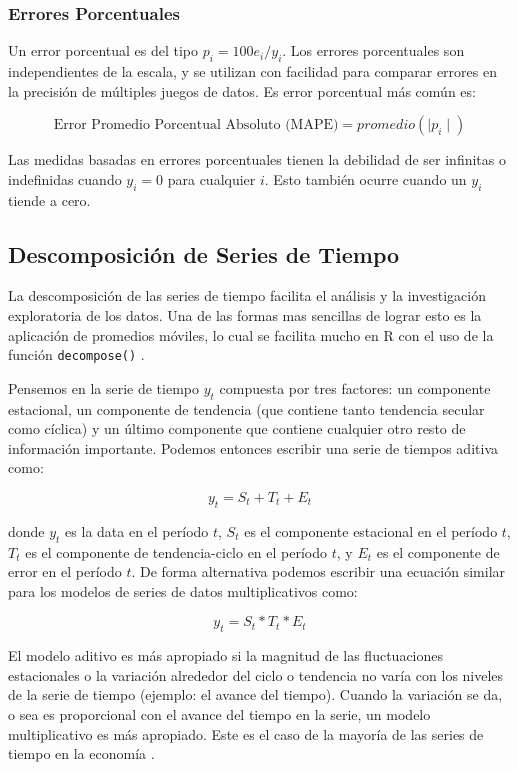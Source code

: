 \subsubsection{Errores Porcentuales}
Un error porcentual es del tipo $p_i = 100 e_i / y_i$. Los errores porcentuales son independientes de la escala, y se utilizan con facilidad para comparar errores en la precisión de múltiples juegos de datos. Es error porcentual más común es:

\[ \text{Error Promedio Porcentual Absoluto (MAPE)} = promedio(\mid p_i \mid) \]

Las medidas basadas en errores porcentuales tienen la debilidad de ser infinitas o indefinidas cuando $y_i = 0$ para cualquier $i$. Esto también ocurre cuando un $y_i$ tiende a cero.

\subsection{Descomposición de Series de Tiempo}
La descomposición de las series de tiempo facilita el análisis y la investigación exploratoria de los datos. Una de las formas mas sencillas de lograr esto es la aplicación de promedios móviles, lo cual se facilita mucho en R con el uso de la función \texttt{decompose()} \cite{daroczi}.

Pensemos en la serie de tiempo $y_t$ compuesta por tres factores: un componente estacional, un componente de tendencia (que contiene tanto tendencia secular como cíclica) y un último componente que contiene cualquier otro resto de información importante. Podemos entonces escribir una serie de tiempos aditiva como:

\[ y_t = S_t + T_t + E_t \]

donde $y_t$ es la data en el período $t$, $S_t$ es el componente estacional en el período $t$, $T_t$ es el componente de tendencia-ciclo en el período $t$, y $E_t$ es el componente de error en el período $t$. De forma alternativa podemos escribir una ecuación similar para los modelos de series de datos multiplicativos como:

\[ y_t = S_t * T_t * E_t  \]

El modelo aditivo es más apropiado si la magnitud de las fluctuaciones estacionales o la variación alrededor del ciclo o tendencia no varía con los niveles de la serie de tiempo (ejemplo: el avance del tiempo). Cuando la variación se da, o sea es proporcional con el avance del tiempo en la serie, un modelo multiplicativo es más apropiado. Este es el caso de la mayoría de las series de tiempo en la economía \cite{hyndman}.

